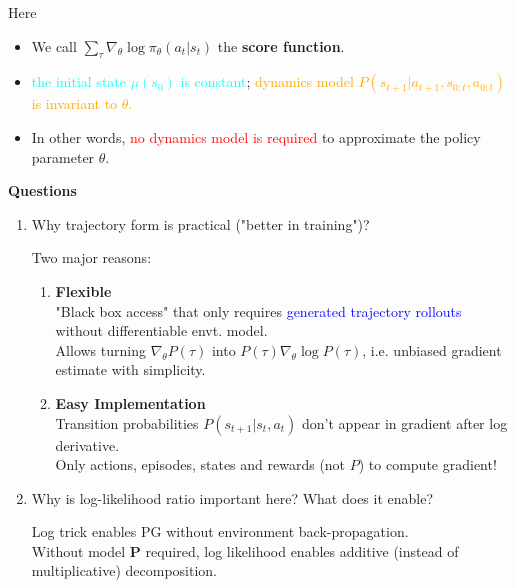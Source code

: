 \documentclass{article}
\begin{document}
Here 
    \begin{itemize}
    \item We call $\sum_{\tau} \nabla_{\theta} \log \pi_{\theta} (a_t | s_t)$ the \textbf{score function}.
    \item \textcolor{cyan}{the initial state $\mu(s_0)$ is constant};  
        \textcolor{orange}{dynamics model $P(s_{t+1} | a_{t+1}, s_{0:t}, a_{0:t})$ is invariant to $\theta$.}
    \item In other words, \textcolor{red}{no dynamics model is required} to approximate the policy parameter $\theta$.
    \end{itemize}

\begin{hintbox}
    \textbf{Questions}
    \begin{enumerate}
    \item Why trajectory form is practical ("better in training")?
        \begin{prfbox}
            Two major reasons:
            \begin{enumerate}
            \item \textbf{Flexible}
                \\"Black box access" that only requires \textcolor{blue}{generated trajectory rollouts} without differentiable envt. model.
                \\Allows turning $\nabla_{\theta} P(\tau)$ into $P(\tau) \nabla_{\theta} \log P(\tau)$, i.e. unbiased gradient estimate with simplicity.
            \item \textbf{Easy Implementation}
                \\Transition probabilities $P(s_{t+1} | s_t, a_t)$ don't appear in gradient after log derivative.
                \\Only actions, episodes, states and rewards (not $P$) to compute gradient!
            \end{enumerate}
        \end{prfbox}
    \item Why is log-likelihood ratio important here? What does it enable?
        \begin{prfbox}
            Log trick enables PG without environment back-propagation.
            \\Without model $\mathbf{P}$ required, log likelihood enables additive (instead of multiplicative) decomposition.
        \end{prfbox}
    \end{enumerate}
\end{hintbox}
\end{document}
